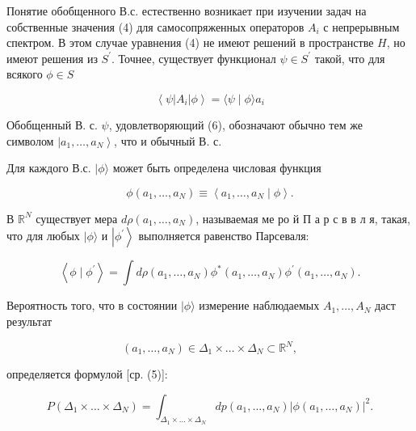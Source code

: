 \documentclass[10pt]{article}
\begin{document}
Понятие обобщенного В.с. естественно возникает при изучении задач на собственные значения (4) для самосопряженных операторов $A_{i}$ с непрерывным спектром. В этом случае уравнения (4) не имеют решений в пространстве $H$, но имеют решения из $S^{\prime}$. Точнее, существует функционал $\psi \in S^{\prime}$ такой, что для всякого $\phi \in S$



\[

\left\langle\psi\left|A_{i}\right| \phi\right\rangle=\langle\psi \mid \phi\rangle a_{i}

\]



Обобщенный В. с. $\psi$, удовлетворяющий (6), обозначают обычно тем же символом $\left|a_{1}, \ldots, a_{N}\right\rangle$, что и обычный В. с.



Для каждого В.с. $|\phi\rangle$ может быть определена числовая функция



\[

\phi\left(a_{1}, \ldots, a_{N}\right) \equiv\left\langle a_{1}, \ldots, a_{N} \mid \phi\right\rangle .

\]



В $\mathbb{R}^{N}$ существует мера $d \rho\left(a_{1}, \ldots, a_{N}\right)$, называемая ме ро й П а р с в в л я, такая, что для любых $|\phi\rangle$ и $\left|\phi^{\prime}\right\rangle$ выполняется равенство Парсеваля:



\[

\left\langle\phi \mid \phi^{\prime}\right\rangle=\int d \rho\left(a_{1}, \ldots, a_{N}\right) \phi^{*}\left(a_{1}, \ldots, a_{N}\right) \phi^{\prime}\left(a_{1}, \ldots, a_{N}\right) .

\]



Вероятность того, что в состоянии $|\phi\rangle$ измерение наблюдаемых $A_{1}, \ldots, A_{N}$ даст результат



\[

\left(a_{1}, \ldots, a_{N}\right) \in \Delta_{1} \times \ldots \times \Delta_{N} \subset \mathbb{R}^{N},

\]



определяется формулой [ср. (5)]:



\[

P\left(\Delta_{1} \times \ldots \times \Delta_{N}\right)=\int_{\Delta_{1} \times \ldots \times \Delta_{N}} d p\left(a_{1}, \ldots, a_{N}\right)\left|\phi\left(a_{1}, \ldots, a_{N}\right)\right|^{2} .

\]
\end{document}
